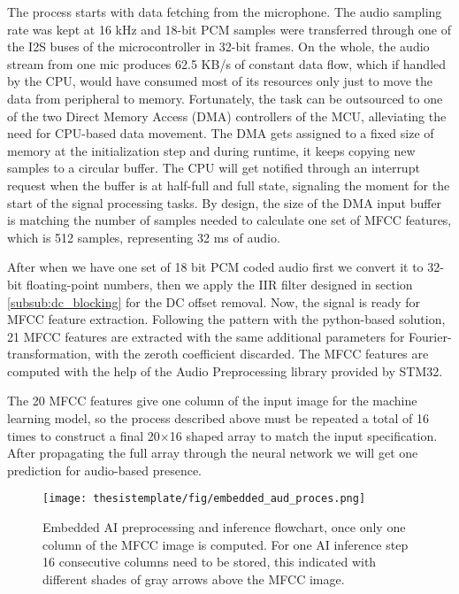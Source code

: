 The process starts with data fetching from the microphone. The audio sampling rate was kept at 16 kHz and 18-bit PCM samples were transferred through one of the I2S buses of the microcontroller in 32-bit frames. On the whole, the audio stream from one mic produces 62.5 KB/s of constant data flow, which if handled by the CPU, would have consumed most of its resources only just to move the data from peripheral to memory. Fortunately, the task can be outsourced to one of the two Direct Memory Access (DMA) controllers of the MCU, alleviating the need for CPU-based data movement. The DMA gets assigned to a fixed size of memory at the initialization step and during runtime, it keeps copying new samples to a circular buffer. The CPU will get notified through an interrupt request when the buffer is at half-full and full state, signaling the moment for the start of the signal processing tasks. By design, the size of the DMA input buffer is matching the number of samples needed to calculate one set of MFCC features, which is 512 samples, representing 32 ms of audio.

After when we have one set of 18 bit PCM coded audio first we convert it to 32-bit floating-point numbers, then we apply the IIR filter designed in section \ref{subsub:dc_blocking} for the DC offset removal. Now, the signal is ready for MFCC feature extraction. Following the pattern with the python-based solution, 21 MFCC features are extracted with the same additional parameters for Fourier-transformation, with the zeroth coefficient discarded. The MFCC features are computed with the help of the Audio Preprocessing library provided by STM32.

The 20 MFCC features give one column of the input image for the machine learning model, so the process described above must be repeated a total of 16 times to construct a final 20$\times$16 shaped array to match the input specification. After propagating the full array through the neural network we will get one prediction for audio-based presence.



\begin{figure}[h!]
  \begin{center}
    \texttt{[image: thesistemplate/fig/embedded\_aud\_proces.png]}
    \caption{Embedded AI preprocessing and inference flowchart, once only one column of the MFCC image is computed. For one AI inference step 16 consecutive columns need to be stored, this indicated with different shades of gray arrows above the MFCC image.}
    \label{fig:embedded_ai_proc}
  \end{center}
\end{figure}


